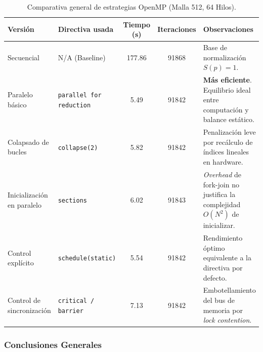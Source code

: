\documentclass[11pt,a4paper]{article}
\begin{document}
\begin{table}[H]
\centering
\renewcommand{\arraystretch}{1.2}
\small
\begin{tabular}{|m{3.5cm}|m{3cm}|c|c|m{3.5cm}|}
\hline
\textbf{Versión} & \textbf{Directiva usada} & \textbf{Tiempo (s)} & \textbf{Iteraciones} & \textbf{Observaciones} \\ \hline
Secuencial & N/A (Baseline) & 177.86 & 91868 & Base de normalización $S(p)=1$. \\ \hline
Paralelo básico & \texttt{parallel for reduction} & 5.49 & 91842 & \textbf{Más eficiente}. Equilibrio ideal entre computación y balance estático. \\ \hline
Colapsado de bucles & \texttt{collapse(2)} & 5.82 & 91842 & Penalización leve por recálculo de índices lineales en hardware. \\ \hline
Inicialización en paralelo & \texttt{sections} & 6.02 & 91843 & \textit{Overhead} de fork-join no justifica la complejidad $O(N^2)$ de inicializar. \\ \hline
Control explícito & \texttt{schedule(static)} & 5.54 & 91842 & Rendimiento óptimo equivalente a la directiva por defecto. \\ \hline
Control de sincronización & \texttt{critical / barrier} & 7.13 & 91842 & Embotellamiento del bus de memoria por \textit{lock contention}. \\ \hline
\end{tabular}
\caption{Comparativa general de estrategias OpenMP (Malla 512, 64 Hilos).}
\label{tab:comparativa_final}
\end{table}

\subsubsection*{Conclusiones Generales}
\end{document}
